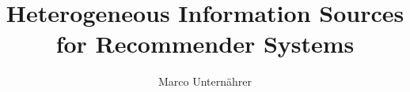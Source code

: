 \documentclass{ddis-thesis}
\author{Marco Unternährer}
\title{Heterogeneous Information Sources for Recommender Systems}
\begin{document}

\frontmatter






\tableofcontents

\mainmatter









\appendix


\backmatter

\normalfont
\clearpage
\listoffigures

\clearpage
\listoftables
\end{document}
